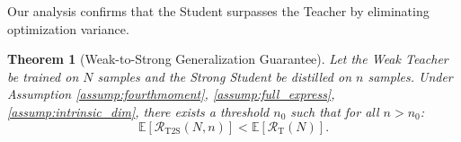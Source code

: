 \documentclass{article}
\theoremstyle{definition}
\theoremstyle{definition}
\theoremstyle{plain}
\newtheorem{theorem}{Theorem}
\theoremstyle{plain}
\newtheorem{assumption}{Assumption}
\theoremstyle{plain}
\theoremstyle{plain}
\theoremstyle{plain}
\newcommand{\bs}[1]{\boldsymbol{\mathbf{#1}}}
\newcommand{\Ex}{\mathbb{E}}
\newcommand{\te}{\mathrm{T}}
\newcommand{\w}{\mathbf{w}}
\begin{document}






Our analysis confirms that the Student surpasses the Teacher by eliminating optimization variance.


\begin{theorem}[Weak-to-Strong Generalization Guarantee]
\label{thm:w2s_bound}
    Let the Weak Teacher be trained on $N$ samples and the Strong Student be distilled on $n$ samples. Under Assumption \ref{assump:fourthmoment}, \ref{assump:full_express}, \ref{assump:intrinsic_dim}, there exists a threshold $n_0$ such that for all $n > n_0$:
    \begin{equation}
        \Ex[\mathcal{R}_{\mathrm{T2S}}(N,n)] < \Ex[\mathcal{R}_{\te}(N)].
    \end{equation}
\end{theorem}
\end{document}
